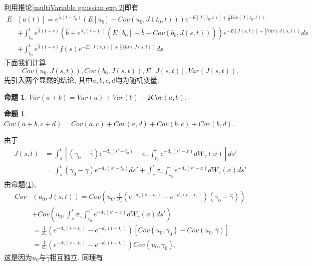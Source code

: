 \documentclass[notitlepage,cs4size,punct,oneside]{ctexrep}
\numberwithin{equation}{section}
\theoremstyle{mystyle}
\newtheorem{proposition}[definition]{\hspace{2em}命题}
\begin{document}
利用推论\ref{multiVariable gaussian exp 2}即有
\begin{equation} \label{E u(t)}
\begin{split}
E&[u(t)] = e^{\hat{\lambda}(t-t_0)}(E[u_0]-Cov(u_0, J(t_0, t)))e^{-E[J(t_0, t)]+\frac{1}{2}Var(J(t_0, t))} \\
&+ \int_{t_0}^t e^{\hat{\lambda}(t-s)}(\hat{b}+e^{\lambda_b(s-t_0)}(E[b_0]-\hat{b}-Cov(b_0, J(s, t))))e^{-E[J(s, t)]+\frac{1}{2}Var(J(s, t))}ds \\
&+ \int_{t_0}^t e^{\hat{\lambda}(t-s)}f(s)e^{-E[J(s, t)]+\frac{1}{2}Var(J(s, t))}ds
\end{split}
\end{equation}
下面我们计算
$$Cov(u_0, J(s, t)), Cov(b_0, J(s, t)), E[J(s, t)], Var(J(s, t)).$$
先引入两个显然的结论, 其中$a, b, c, d$均为随机变量:
\begin{proposition} \label{Var 1}
$Var(a+b) = Var(a)+Var(b)+2Cov(a, b)$.
\end{proposition}
\begin{proposition} \label{Cov 1}
$Cov(a+b, c+d) = Cov(a, c)+Cov(a, d)+Cov(b, c)+Cov(b, d)$.
\end{proposition}
由于
\begin{equation}
\begin{split} \label{J(s, t) all}
J(s, t) &= \int_s^t \left[(\gamma_0-\hat{\gamma})e^{-d_\gamma(s'-t_0)}+\sigma_\gamma\int_{t_0}^{s'}e^{-d_\gamma(s'-x)}dW_\gamma(x)\right]ds' \\
& = \int_s^t(\gamma_0-\hat{\gamma})e^{-d_\gamma(s'-t_0)}ds' +\int_s^t \sigma_\gamma\int_{t_0}^{s'} e^{-d_\gamma(s'-x)}dW_\gamma(x)ds'
\end{split}
\end{equation}
由命题(\ref{Cov 1}),
\begin{equation} \label{Cov u0 J(s, t)}
\begin{split}
Cov&(u_0, J(s, t)) = Cov\left(u_0, \frac{1}{d_\gamma}(e^{-d_\gamma(s-t_0)}-e^{-d_\gamma(t-t_0)})(\gamma_0 - \hat{\gamma})\right) \\
&+ Cov\left(u_0, \int_s^t \sigma_\gamma \int_{t_0}^{s'} e^{-d_\gamma(s'-x)} dW_\gamma(x)ds'\right)\\
&= \frac{1}{d_\gamma}(e^{-d_\gamma(s-t_0)}-e^{-d_\gamma(t-t_0)})[Cov(u_0, \gamma_0)-Cov(u_0, \hat{\gamma})] \\
&= \frac{1}{d_\gamma}(e^{-d_\gamma(s-t_0)}-e^{-d_\gamma(t-t_0)})Cov(u_0, \gamma_0).
\end{split}
\end{equation}
这是因为$u_0$与$\hat{\gamma}$相互独立. 同理有
\end{document}
